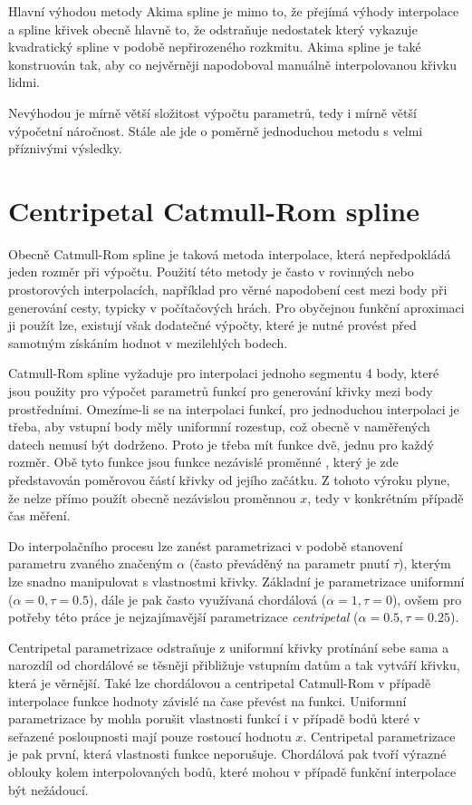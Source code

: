 \documentclass[]{thesiskiv}
\begin{document}
Hlavní výhodou metody Akima spline je mimo to, že přejímá výhody interpolace a spline křivek obecně hlavně to, že odstraňuje nedostatek který vykazuje kvadratický spline v podobě nepřirozeného rozkmitu. Akima spline je také konstruován tak, aby co nejvěrněji napodoboval manuálně interpolovanou křivku lidmi.

Nevýhodou je mírně větší složitost výpočtu parametrů, tedy i mírně větší výpočetní náročnost. Stále ale jde o poměrně jednoduchou metodu s velmi příznivými výsledky.

\section{Centripetal Catmull-Rom spline}

Obecně Catmull-Rom spline je taková metoda interpolace, která nepředpokládá jeden rozměr při výpočtu. Použití této metody je často v rovinných nebo prostorových interpolacích, například pro věrné napodobení cest mezi body při generování cesty, typicky v počítačových hrách. Pro obyčejnou funkční aproximaci ji použít lze, existují však dodatečné výpočty, které je nutné provést před samotným získáním hodnot v mezilehlých bodech.

Catmull-Rom spline vyžaduje pro interpolaci jednoho segmentu 4 body, které jsou použity pro výpočet parametrů funkcí pro generování křivky mezi body prostředními. Omezíme-li se na interpolaci funkcí, pro jednoduchou interpolaci je třeba, aby vstupní body měly uniformní rozestup, což obecně v naměřených datech nemusí být dodrženo. Proto je třeba mít funkce dvě, jednu pro každý rozměr. Obě tyto funkce jsou funkce nezávislé proměnné , který je zde představován poměrovou částí křivky od jejího začátku. Z tohoto výroku plyne, že nelze přímo použít obecně nezávislou proměnnou $x$, tedy v konkrétním případě čas měření.

Do interpolačního procesu lze zanést parametrizaci v podobě stanovení parametru zvaného  značeným $\alpha$ (často převáděný na parametr pnutí $\tau$), kterým lze snadno manipulovat s vlastnostmi křivky. Základní je parametrizace uniformní ($\alpha = 0, \tau = 0.5$), dále je pak často využívaná chordálová ($\alpha = 1, \tau = 0$), ovšem pro potřeby této práce je nejzajímavější parametrizace \emph{centripetal} ($\alpha = 0.5, \tau = 0.25$).

Centripetal parametrizace odstraňuje z uniformní křivky protínání sebe sama a narozdíl od chordálové se těsněji přibližuje vstupním datům a tak vytváří křivku, která je věrnější. Také lze chordálovou a centripetal Catmull-Rom v případě interpolace funkce hodnoty závislé na čase převést na funkci. Uniformní parametrizace by mohla porušit vlastnosti funkcí i v případě bodů které v seřazené posloupnosti mají pouze rostoucí hodnotu $x$. Centripetal parametrizace je pak první, která vlastnosti funkce neporušuje. Chordálová pak tvoří výrazné oblouky kolem interpolovaných bodů, které mohou v případě funkční interpolace být nežádoucí.
\end{document}
